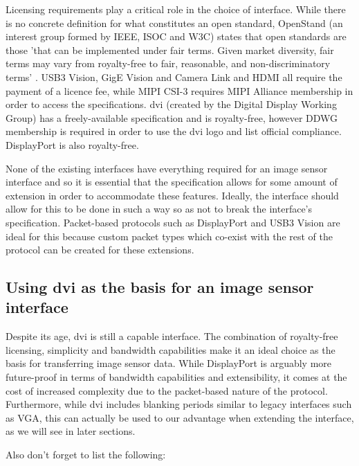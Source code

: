 Licensing requirements play a critical role in the choice of interface. While there is no concrete definition for what constitutes an open standard, OpenStand (an interest group formed by IEEE, ISOC and W3C) states that open standards are those 'that can be implemented under fair terms. Given market diversity, fair terms may vary from royalty-free to fair, reasonable, and non-discriminatory terms' \cite{open_standard_definition}. USB3 Vision, GigE Vision and Camera Link and HDMI all require the payment of a licence fee, while MIPI CSI-3 requires MIPI Alliance membership in order to access the specifications. \gls{dvi} (created by the Digital Display Working Group) has a freely-available specification and is royalty-free, however DDWG membership is required in order to use the \gls{dvi} logo and list official compliance. DisplayPort is also royalty-free.

None of the existing interfaces have everything required for an image sensor interface and so it is essential that the specification allows for some amount of extension in order to accommodate these features. Ideally, the interface should allow for this to be done in such a way so as not to break the interface's specification. Packet-based protocols such as DisplayPort and USB3 Vision are ideal for this because custom packet types which co-exist with the rest of the protocol can be created for these extensions. 

\subsection{Using \gls{dvi} as the basis for an image sensor interface}
Despite its age, \gls{dvi} is still a capable interface. The combination of royalty-free licensing, simplicity and bandwidth capabilities make it an ideal choice as the basis for transferring image sensor data. While DisplayPort is arguably more future-proof in terms of bandwidth capabilities and extensibility, it comes at the cost of increased complexity due to the packet-based nature of the protocol. Furthermore, while \gls{dvi} includes blanking periods similar to legacy interfaces such as VGA, this can actually be used to our advantage when extending the interface, as we will see in later sections.

Also don't forget to list the following:

